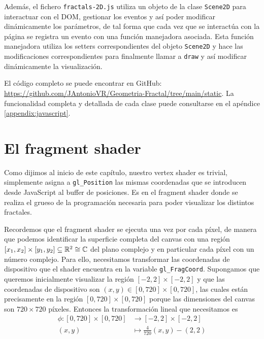 Además, el fichero \verb|fractals-2D.js| utiliza un objeto de la clase \verb|Scene2D| para interactuar con el DOM, gestionar los eventos y así poder modificar dinámicamente los parámetros, de tal forma que cada vez que se interactúa con la página se registra un evento con una función manejadora asociada. Esta función manejadora utiliza los setters correspondientes del objeto \verb|Scene2D| y hace las modificaciones correspondientes para finalmente llamar a \verb|draw| y así modificar dinámicamente la visualización.

El código completo se puede encontrar en GitHub: \url{https://github.com/JAntonioVR/Geometria-Fractal/tree/main/static}. La funcionalidad completa y detallada de cada clase puede consultarse en el apéndice \ref{appendix:javascript}.

\section{El fragment shader}
\label{section:fs-2D}

Como dijimos al inicio de este capítulo, nuestro vertex shader es trivial, simplemente asigna a \verb|gl_Position| las mismas coordenadas que se introducen desde JavaScript al buffer de posiciones. Es en el fragment shader donde se realiza el grueso de la programación necesaria para poder visualizar los distintos fractales.

Recordemos que el fragment shader se ejecuta una vez por cada píxel, de manera que podemos identificar la superficie completa del canvas con una región $[x_1,x_2]\times [y_1,y_2]\subseteq\mathbb{R}^2\cong\mathbb{C}$ del plano complejo y en particular cada píxel con un número complejo. Para ello, necesitamos transformar las coordenadas de dispositivo que el shader encuentra en la variable \verb|gl_FragCoord|. Supongamos que queremos inicialmente visualizar la región $[-2,2]\times[-2,2]$ y que las coordenadas de dispositivo son $(x,y)\in[0,720]\times[0,720]$, las cuales están precisamente en la región $[0,720]\times[0,720]$ porque las dimensiones del canvas son $720\times 720$ píxeles. Entonces la transformación lineal que necesitamos es 
\begin{equation}
\label{eq:transformacion-lineal-1}
\begin{split}
    \phi:[0,720]\times[0,720] & \longrightarrow [-2,2]\times[-2,2] \\
    (x,y) & \longmapsto \frac{4}{720}(x,y)-(2,2)
\end{split}
\end{equation}

